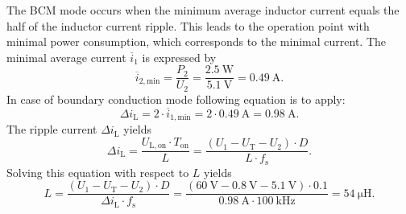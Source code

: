 

\begin{solutionblock}
    The BCM mode occurs when the minimum average inductor current equals the half of the inductor current ripple.
    This leads to the operation point with minimal power consumption, which corresponds to the minimal current.
    The minimal average current $\overline{i}_\mathrm{1}$ is expressed by
    \begin{equation*}
        \overline{i}_\mathrm{2,min} = \frac{P_\mathrm{2}}{U_\mathrm{2}} = \frac{\SI{2.5}{\watt}} {\SI{5.1}{\volt}} = \SI{0.49}{\ampere}.
    \end{equation*}
    In case of boundary conduction mode following equation is to apply:
    \begin{equation*}
        \Delta i_\mathrm{L}= 2 \cdot \overline{i}_\mathrm{1,min} = 2 \cdot \SI{0.49}{\ampere} = \SI{0.98}{\ampere}.
    \end{equation*}
    The ripple current $\Delta i_\mathrm{L}$ yields
    \begin{equation*}
        \Delta i_\mathrm{L}=\frac{U_\mathrm{L,on} \cdot T_\mathrm{on}}{L}
        =\frac{(U_\mathrm{1} - U_\mathrm{T} - U_\mathrm{2}) \cdot D}{L \cdot f_\mathrm{s}}.
    \end{equation*}
    Solving this equation with respect to $L$ yields
    \begin{equation*}
        L= \frac{(U_\mathrm{1} -U_\mathrm{T} - U_\mathrm{2}) \cdot D}{\Delta i_\mathrm{L} \cdot f_\mathrm{s}}
        = \frac{(\SI{60}{\volt} - \SI{0.8}{\volt} - \SI{5.1}{\volt}) \cdot 0.1} {\SI{0.98}{\ampere} \cdot \SI{100}{\kilo\hertz}}
        = \SI{54}{\micro\henry}.
    \end{equation*}
\end{solutionblock}


